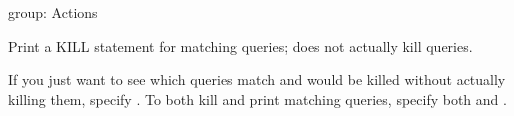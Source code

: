 \documentclass[letterpaper,10pt,english]{sphinxmanual}
\begin{document}

\begin{fulllineitems}
\label{\detokenize{mariadb-kill:cmdoption-mariadb-kill-print}}
\sphinxAtStartPar
group: Actions

\sphinxAtStartPar
Print a KILL statement for matching queries; does not actually kill queries.

\sphinxAtStartPar
If you just want to see which queries match and would be killed without
actually killing them, specify {\hyperref[\detokenize{mariadb-kill:cmdoption-mariadb-kill-print}]{}}.  To both kill and print
matching queries, specify both {\hyperref[\detokenize{mariadb-kill:cmdoption-mariadb-kill-kill}]{}} and {\hyperref[\detokenize{mariadb-kill:cmdoption-mariadb-kill-print}]{}}.

\end{fulllineitems}
\end{document}
